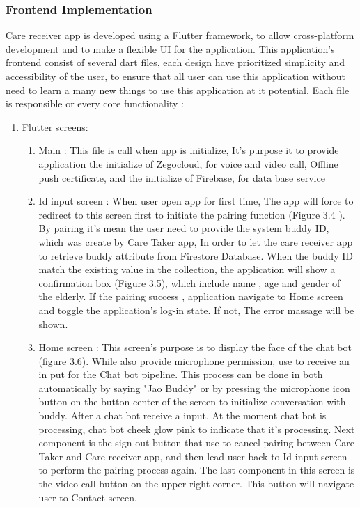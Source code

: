 \subsubsection{Frontend Implementation}
{ 
	\setlength{\leftskip}{1.8cm}
	\setlength{\parindent}{5em}
	Care receiver app is developed using a Flutter framework, to allow cross-platform development and to make a flexible UI for the application. This application’s frontend consist of several dart files, each  design have prioritized simplicity and accessibility of the user, to ensure that all user can use this application without need to learn a many new things to use this application at it potential. Each file is responsible or every core functionality : 
	\par
}
\begin{enumerate}[leftmargin=2.2cm]
	\item Flutter screens:
	\begin{enumerate}[label=\alph*.] 
		\item Main : This file is call when app is initialize, It's purpose it to provide application the initialize of Zegocloud, for voice and video call, Offline push certificate, and the initialize of Firebase, for data base service
		
		\item Id input screen   : When user open app for first time, The app will force to redirect to this screen first to initiate the pairing function (Figure 3.4 ). By pairing it's mean the user need to provide the system  buddy ID, which was create by Care Taker app, In order to let the care receiver app to retrieve 
		buddy attribute from Firestore Database. When the buddy ID match the existing value in the collection, the application will show a confirmation box (Figure 3.5), which include name , age and gender of the elderly. If the pairing success , application navigate to Home screen and toggle the application's log-in state. If not, The error massage will be shown.
		
		\item Home screen       : This screen's purpose is to display the face of the chat bot (figure 3.6). While also provide microphone permission, use to receive an in put for the Chat bot pipeline. This process can be done in both automatically by saying "Jao Buddy" or by pressing the microphone icon button on the button center of the screen to initialize conversation with buddy. After a chat bot receive a input, At the moment chat bot is processing, chat bot cheek glow pink to indicate that it's processing. Next component is the sign out button that use to cancel pairing between Care Taker and Care receiver app, and then lead user back to Id input screen to perform the pairing process again. The last component in this screen  is the video call button on the upper right corner. This button will navigate user to Contact screen.
		

\end{enumerate}
\end{enumerate}
